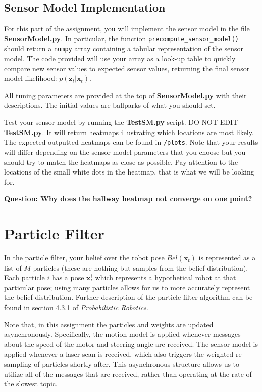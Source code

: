 \documentclass[final]{article}
\begin{document}
\subsection{Sensor Model Implementation}
For this part of the assignment, you will implement the sensor model in the file \textbf{SensorModel.py}. In particular, the function \texttt{precompute\_sensor\_model()} should return a \texttt{numpy} array containing a tabular representation of the sensor model. The code provided will use your array as a look-up table to quickly compare new sensor values to expected sensor values, returning the final sensor model likelihood: $p(\mathbf{z}_t | \mathbf{x}_t)$.

All tuning parameters are provided at the top of \textbf{SensorModel.py} with their descriptions. The initial values are ballparks of what you should set.

Test your sensor model by running the \textbf{TestSM.py} script. DO NOT EDIT \textbf{TestSM.py}. It will return heatmaps illustrating which locations are most likely. The expected outputted heatmaps can be found in \texttt{/plots}. Note that your results will differ depending on the sensor model parameters that you choose but you should try to match the heatmaps as close as possible. Pay attention to the locations of the small white dots in the heatmap, that is what we will be looking for.

\textbf{Question: Why does the hallway heatmap not converge on one point?}

\section{Particle Filter}
 In the particle filter, your belief over the robot pose $Bel(\mathbf{x}_t)$ is represented as a list of $M$ particles (these are nothing but samples from the belief distribution). Each particle $i$ has a pose $\mathbf{x}^i_t$ which represents a hypothetical robot at that particular pose; using many particles allows for us to more accurately represent the belief distribution. Further description of the particle filter algorithm can be found in section 4.3.1 of \textit{Probabilistic Robotics}. 

Note that, in this assignment the particles and weights are updated asynchronously. Specifically, the motion model is applied whenever messages about the speed of the motor and steering angle are received. The sensor model is applied whenever a laser scan is received, which also triggers the weighted re-sampling of particles shortly after. This asynchronous structure allows us to utilize all of the messages that are received, rather than operating at the rate of the slowest topic.
\end{document}
